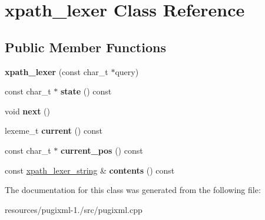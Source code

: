\hypertarget{classxpath__lexer}{\section{xpath\+\_\+lexer Class Reference}
\label{classxpath__lexer}
}
\subsection*{Public Member Functions}
\begin{DoxyCompactItemize}
\item 
\hypertarget{classxpath__lexer_aa52661c9ba7dfa262d3ab49f578653c3}{{\bfseries xpath\+\_\+lexer} (const char\+\_\+t $\ast$query)}\label{classxpath__lexer_aa52661c9ba7dfa262d3ab49f578653c3}

\item 
\hypertarget{classxpath__lexer_a3794e29f3bec2fa31346766eea978cbf}{const char\+\_\+t $\ast$ {\bfseries state} () const }\label{classxpath__lexer_a3794e29f3bec2fa31346766eea978cbf}

\item 
\hypertarget{classxpath__lexer_a32684b3097fccb4d626da620b44b72ad}{void {\bfseries next} ()}\label{classxpath__lexer_a32684b3097fccb4d626da620b44b72ad}

\item 
\hypertarget{classxpath__lexer_a06cdc258948ef3a1a69bd7d5733fd987}{lexeme\+\_\+t {\bfseries current} () const }\label{classxpath__lexer_a06cdc258948ef3a1a69bd7d5733fd987}

\item 
\hypertarget{classxpath__lexer_a7adef722d64938e3ba79ae1a7e1c0d71}{const char\+\_\+t $\ast$ {\bfseries current\+\_\+pos} () const }\label{classxpath__lexer_a7adef722d64938e3ba79ae1a7e1c0d71}

\item 
\hypertarget{classxpath__lexer_aebb02b6d507f5e0839bfa42116bdbc9c}{const \hyperlink{structxpath__lexer__string}{xpath\+\_\+lexer\+\_\+string} \& {\bfseries contents} () const }\label{classxpath__lexer_aebb02b6d507f5e0839bfa42116bdbc9c}

\end{DoxyCompactItemize}


The documentation for this class was generated from the following file\+:\begin{DoxyCompactItemize}
\item 
resources/pugixml-\/1./src/pugixml.\+cpp\end{DoxyCompactItemize}
